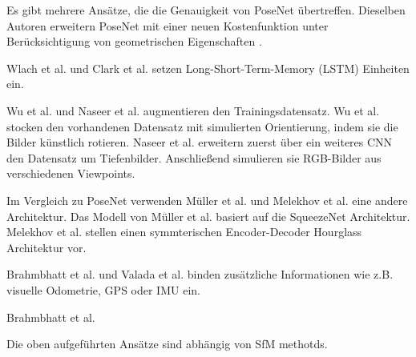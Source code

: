 Es gibt mehrere Ansätze, die die Genauigkeit von PoseNet übertreffen.
Dieselben Autoren erweitern PoseNet mit einer neuen Kostenfunktion unter Berücksichtigung von geometrischen Eigenschaften \cite{kendallGeometricLossFunctions2017}. 

Wlach et al. \cite{walchImagebasedLocalizationUsing2016} und Clark et al. \cite{clarkVidLocDeepSpatioTemporal2017} setzen Long-Short-Term-Memory (LSTM) \cite{hochreiterLongShortTermMemory1997a} Einheiten ein. 


Wu et al. \cite{wuDelvingDeeperConvolutional2017} und Naseer et al. \cite{naseerDeepRegressionMonocular2017} augmentieren den Trainingsdatensatz. 
Wu et al. \cite{wuDelvingDeeperConvolutional2017} stocken den vorhandenen Datensatz mit simulierten Orientierung, indem sie die Bilder künstlich rotieren. Naseer et al. \cite{naseerDeepRegressionMonocular2017} erweitern zuerst über ein weiteres CNN den Datensatz um Tiefenbilder. Anschließend simulieren sie RGB-Bilder aus verschiedenen Viewpoints.


Im Vergleich zu PoseNet verwenden Müller et al. \cite{mullerSQUEEZEPOSENETIMAGEBASED2017} und Melekhov et al.\cite{melekhovImageBasedLocalizationUsing2017} eine andere Architektur. 
Das Modell von Müller et al. \cite{mullerSQUEEZEPOSENETIMAGEBASED2017} basiert auf die SqueezeNet\cite{iandolaSqueezeNetAlexNetlevelAccuracy2016} Architektur. Melekhov et al.\cite{melekhovImageBasedLocalizationUsing2017} stellen einen symmterischen Encoder-Decoder Hourglass Architektur vor.

Brahmbhatt et al. \cite{brahmbhattGeometryAwareLearningMaps2018} und Valada et al. \cite{valadaDeepAuxiliaryLearning2018, valadaIncorporatingSemanticGeometric} binden zusätzliche Informationen wie z.B. visuelle Odometrie, GPS oder IMU ein.

Brahmbhatt et al. \cite{brahmbhattGeometryAwareLearningMaps2018} 

Die oben aufgeführten Ansätze sind abhängig von SfM methotds.



% 
